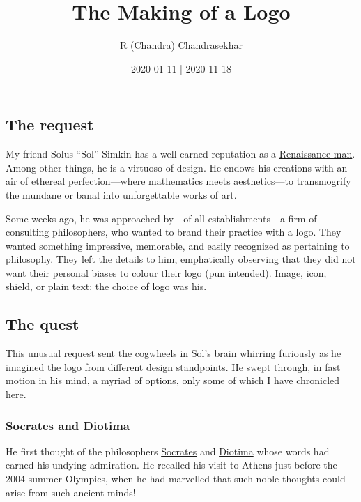 \documentclass[
  a4paper,
]{article}
\title{The Making of a Logo}
\author{R (Chandra) Chandrasekhar}
\date{2020-01-11 | 2020-11-18}
\begin{document}
\maketitle

\thispagestyle{empty}


\hypertarget{the-request}{%
\subsection{The request}\label{the-request}}

My friend Solus ``Sol'' Simkin has a well-earned reputation as a
\href{https://www.thefreedictionary.com/renaissance+man}{Renaissance
man}. Among other things, he is a virtuoso of design. He endows his
creations with an air of ethereal perfection---where mathematics meets
aesthetics---to transmogrify the mundane or banal into unforgettable
works of art.

Some weeks ago, he was approached by---of all establishments---a firm of
consulting philosophers, who wanted to brand their practice with a logo.
They wanted something impressive, memorable, and easily recognized as
pertaining to philosophy. They left the details to him, emphatically
observing that they did not want their personal biases to colour their
logo (pun intended). Image, icon, shield, or plain text: the choice of
logo was his.

\hypertarget{the-quest}{%
\subsection{The quest}\label{the-quest}}

This unusual request sent the cogwheels in Sol's brain whirring
furiously as he imagined the logo from different design standpoints. He
swept through, in fast motion in his mind, a myriad of options, only
some of which I have chronicled here.

\hypertarget{socrates-and-diotima}{%
\subsubsection{Socrates and Diotima}\label{socrates-and-diotima}}

He first thought of the philosophers
\href{https://en.wikipedia.org/wiki/Socrates}{Socrates} and
\href{https://en.wikipedia.org/wiki/Diotima_of_Mantinea}{Diotima} whose
words had earned his undying admiration. He recalled his visit to Athens
just before the 2004 summer Olympics, when he had marvelled that such
noble thoughts could arise from such ancient minds!
\end{document}

